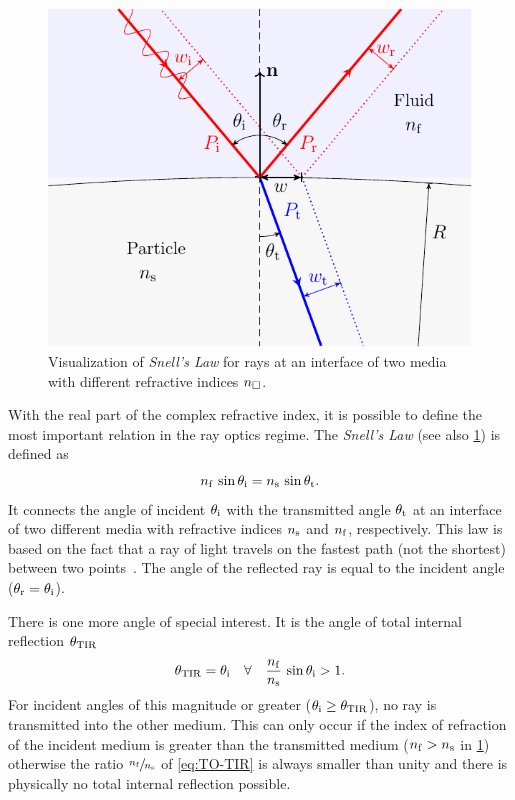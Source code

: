 \begin{figure}[tbp]
  \centering
  \includegraphics[]{Plots/cache/Snell.pdf}
  \caption{Visualization of \emph{Snell's Law} for rays at an interface of two 
  media with different refractive indices $n_{\Box}$.}
  \label{fig:TO-Snell}
\end{figure}

With the real part of the complex refractive index, it is possible to define 
the most important relation in the ray optics regime. The \emph{Snell's Law} 
(see also \cref{fig:TO-Snell}) is defined as
\begin{equation}
  n_{\mathrm{f}}\,\sin\theta_{\mathrm{i}} = n_{\mathrm{s}}\,\sin\theta_{\mathrm{t}}.
  \label{eq:TO-Snell}
\end{equation}
It connects the angle of incident $\theta_{\mathrm{i}}$ with the transmitted angle 
$\theta_{\mathrm{t}}$ at an interface of two different media with refractive indices 
$n_{\mathrm{s}}$ and $n_{\mathrm{f}}$, respectively. This law is based on the fact that a ray of 
light travels on the fastest path (not the shortest) between two 
points~\cite{Born1980Ch3}. The angle of the reflected ray is equal to the 
incident angle ($\theta_{\mathrm{r}}=\theta_{\mathrm{i}}$).

There is one more angle of special interest. It is the angle of total internal 
reflection $\theta_{\mathrm{TIR}}$
\begin{equation}
  \theta_{\mathrm{TIR}}=\theta_{\mathrm{i}} \quad\forall\quad \frac{n_{\mathrm{f}}}{n_{\mathrm{s}}}\,\sin\theta_{\mathrm{i}} 
  > 1.
  \label{eq:TO-TIR}
\end{equation}
For incident angles of this magnitude or greater 
($\theta_{\mathrm{i}}\geq\theta_{\mathrm{TIR}}$), no ray is transmitted into the other 
medium. This can only occur if the index of refraction of the incident medium 
is greater than the transmitted medium ($n_{\mathrm{f}}>n_{\mathrm{s}}$ in \cref{fig:TO-Snell}) 
otherwise the ratio $\sfrac{n_{\mathrm{f}}}{n_{\mathrm{s}}}$ of \cref{eq:TO-TIR} is always smaller 
than unity and there is physically no total internal reflection possible.

